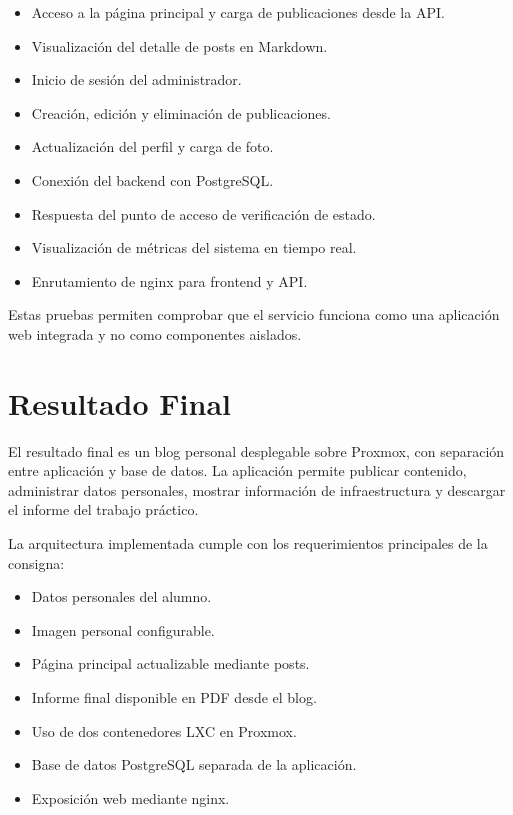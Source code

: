 \documentclass[twoside, 11pt, a4paper]{article}
\begin{document}
    \begin{itemize}
        \item Acceso a la página principal y carga de publicaciones desde la API.
        \item Visualización del detalle de posts en Markdown.
        \item Inicio de sesión del administrador.
        \item Creación, edición y eliminación de publicaciones.
        \item Actualización del perfil y carga de foto.
        \item Conexión del backend con PostgreSQL.
        \item Respuesta del punto de acceso de verificación de estado.
        \item Visualización de métricas del sistema en tiempo real.
        \item Enrutamiento de nginx para frontend y API.
    \end{itemize}

    Estas pruebas permiten comprobar que el servicio funciona como una aplicación web integrada y no como componentes aislados.

    \section{Resultado Final}

    El resultado final es un blog personal desplegable sobre Proxmox, con separación entre aplicación y base de datos. La aplicación permite publicar contenido, administrar datos personales, mostrar información de infraestructura y descargar el informe del trabajo práctico.

    La arquitectura implementada cumple con los requerimientos principales de la consigna:

    \begin{itemize}
        \item Datos personales del alumno.
        \item Imagen personal configurable.
        \item Página principal actualizable mediante posts.
        \item Informe final disponible en PDF desde el blog.
        \item Uso de dos contenedores LXC en Proxmox.
        \item Base de datos PostgreSQL separada de la aplicación.
        \item Exposición web mediante nginx.
    \end{itemize}
\end{document}
